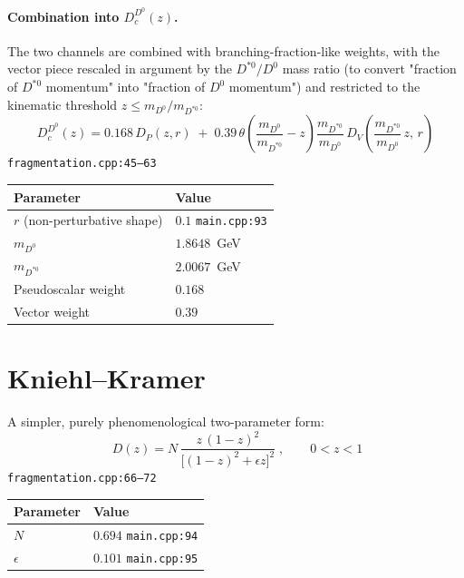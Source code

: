 \documentclass[11pt]{article}
\newcommand{\code}[1]{\texttt{#1}}
\begin{document}
\paragraph{Combination into $D_c^{D^0}(z)$.}
The two channels are combined with branching-fraction-like weights, with the vector piece rescaled in argument by the $D^{*0}/D^0$ mass ratio (to convert "fraction of $D^{*0}$ momentum" into "fraction of $D^0$ momentum") and restricted to the kinematic threshold $z\le m_{D^0}/m_{D^{*0}}$:
\begin{equation}
  \boxed{\;D_c^{D^0}(z) = 0.168\,D_P(z,r) \;+\; 0.39\,\theta\!\left(\frac{m_{D^0}}{m_{D^{*0}}}-z\right)\frac{m_{D^{*0}}}{m_{D^0}}\,D_V\!\left(\frac{m_{D^{*0}}}{m_{D^0}}\,z,\,r\right)\;}
\end{equation}
\hfill{\footnotesize\code{fragmentation.cpp:45--63}}
\begin{center}
\begin{tabular}{@{}ll@{}}
\toprule
Parameter & Value \\
\midrule
$r$ (non-perturbative shape) & $0.1$ \quad\code{main.cpp:93} \\
$m_{D^0}$ & $1.8648$~GeV \\
$m_{D^{*0}}$ & $2.0067$~GeV \\
Pseudoscalar weight & $0.168$ \\
Vector weight & $0.39$ \\
\bottomrule
\end{tabular}
\end{center}

\section{Kniehl--Kramer}
A simpler, purely phenomenological two-parameter form:
\begin{equation}
  \boxed{\;D(z) = N\,\frac{z\,(1-z)^2}{\big[(1-z)^2+\epsilon z\big]^2}\;}, \qquad 0<z<1
\end{equation}
\hfill{\footnotesize\code{fragmentation.cpp:66--72}}
\begin{center}
\begin{tabular}{@{}ll@{}}
\toprule
Parameter & Value \\
\midrule
$N$ & $0.694$ \quad\code{main.cpp:94} \\
$\epsilon$ & $0.101$ \quad\code{main.cpp:95} \\
\bottomrule
\end{tabular}
\end{center}
\end{document}
